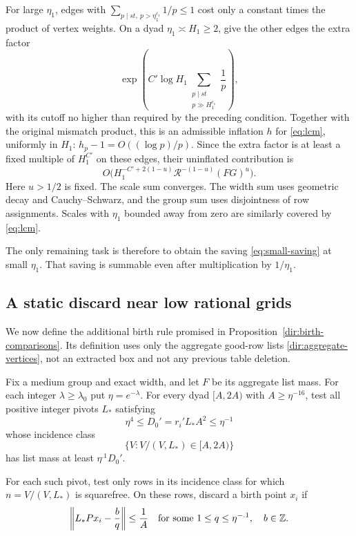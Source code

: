 For large $\eta_1$, edges with
$\sum_{p\mid st,\ p>\eta_1^{c_1}}1/p\le1$ cost only a constant times
the product of vertex weights. On a dyad $\eta_1\asymp H_1\ge2$,
give the other edges the extra factor
\[
 \exp\left(C'\log H_1
       \sum_{\substack{p\mid st\\p\gg H_1^{c_1}}}\frac1p\right),
\]
with its cutoff no higher than required by the preceding condition.
Together with the original mismatch product, this is an admissible
inflation $h$ for \eqref{eq:lcm}, uniformly in $H_1$:
$h_p-1=O((\log p)/p)$. Since the extra factor is at least a fixed
multiple of $H_1^{C'}$ on these edges, their uninflated contribution is
\[
 O\bigl(
 H_1^{-C'+2(1-u)}
 \mathcal R^{-(1-u)}(FG)^u
 \bigr).
\]
Here $u>1/2$ is fixed.
The scale sum converges. The width sum uses geometric decay and
Cauchy--Schwarz, and the group sum uses disjointness of row assignments.
Scales with $\eta_1$ bounded away from zero are similarly covered by
\eqref{eq:lcm}.

The only remaining task is therefore to obtain the saving
\eqref{eq:small-saving} at small $\eta_1$. That saving is summable even
after multiplication by $1/\eta_1$.

\subsection{A static discard near low rational grids}

We now define the additional birth rule promised in
Proposition~\ref{dir:birth-comparisons}. Its definition uses only the
aggregate good-row lists \eqref{dir:aggregate-vertices}, not an extracted
box and not any previous table deletion.

\begin{construction}\label{dir:hole-rule}
Fix a medium group and exact width, and let $F$ be its aggregate list
mass. For each integer $\lambda\ge\lambda_0$ put $\eta=e^{-\lambda}$.
For every dyad $[A,2A)$ with $A\ge\eta^{-16}$, test all positive integer
pivots $L_*$ satisfying
\[
 \eta^4\le D_0'=r_i'L_*A^2\le\eta^{-1}
\]
whose incidence class
\[
 \{V: V/(V,L_*)\in[A,2A)\}
\]
has list mass at least $\eta^{.1}D_0'$.

For each such pivot, test only rows in its incidence class for which
$n=V/(V,L_*)$ is squarefree. On these rows, discard a birth point $x_i$ if
\[
 \left\|L_*P x_i-\frac{b}{q}\right\|\le\frac1A
 \quad\hbox{for some }1\le q\le\eta^{-.1},\quad b\in\mathbb Z.
\]
\end{construction}

